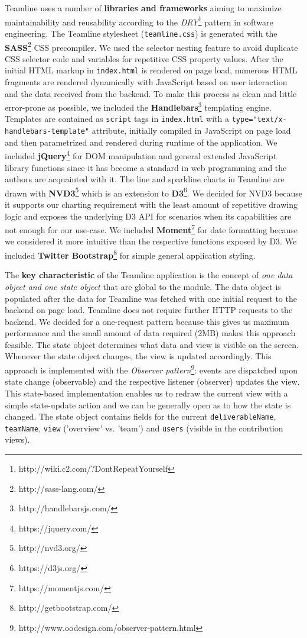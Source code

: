 \documentclass[../manifest.tex]{subfiles}
\begin{document}
Teamline uses a number of \textbf{libraries and frameworks} aiming to maximize maintainability and reusability according to the \textit{DRY}\footnote{http://wiki.c2.com/?DontRepeatYourself} pattern in software engineering. The Teamline stylesheet (\texttt{teamline.css}) is generated with the \textbf{SASS}\footnote{http://sass-lang.com/} CSS precompiler. We used the selector nesting feature to avoid duplicate CSS selector code and variables for repetitive CSS property values. After the initial HTML markup in \texttt{index.html} is rendered on page load, numerous HTML fragments are rendered dynamically with JavaScript based on user interaction and the data received from the backend. To make this process as clean and little error-prone as possible, we included the \textbf{Handlebars}\footnote{http://handlebarsjs.com/} templating engine. Templates are contained as \texttt{script} tags in \texttt{index.html} with a \texttt{type="text/x-handlebars-template"} attribute, initially compiled in JavaScript on page load and then parametrized and rendered during runtime of the application. We included \textbf{jQuery}\footnote{https://jquery.com/} for DOM manipulation and general extended JavaScript library functions since it has become a standard in web programming and the authors are acquainted with it. The line and sparkline charts in Teamline are drawn with \textbf{NVD3}\footnote{http://nvd3.org/} which is an extension to \textbf{D3}\footnote{https://d3js.org/}. We decided for NVD3 because it supports our charting requirement with the least amount of repetitive drawing logic and exposes the underlying D3 API for scenarios when its capabilities are not enough for our use-case. We included \textbf{Moment}\footnote{https://momentjs.com/} for date formatting because we considered it more intuitive than the respective functions exposed by D3. We included \textbf{Twitter Bootstrap}\footnote{http://getbootstrap.com/} for simple general application styling.

The \textbf{key characteristic} of the Teamline application is the concept of \textit{one data object and one state object} that are global to the module. The data object is populated after the data for Teamline was fetched with one initial request to the backend on page load. Teamline does not require further HTTP requests to the backend. We decided for a one-request pattern because this gives us maximum performance and the small amount of data required (\texttildelow2MB) makes this approach feasible. The state object determines what data and view is visible on the screen. Whenever the state object changes, the view is updated accordingly. This approach is implemented with the \textit{Observer pattern}\footnote{http://www.oodesign.com/observer-pattern.html}: events are dispatched upon state change (observable) and the respective listener (observer) updates the view. This state-based implementation enables us to redraw the current view with a simple state-update action and we can be generally open as to how the state is changed. The state object contains fields for the current \texttt{deliverableName}, \texttt{teamName}, \texttt{view} ('overview' vs. 'team') and \texttt{users} (visible in the contribution views).
\end{document}
